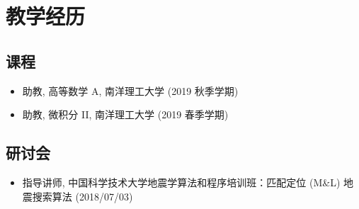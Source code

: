 \section{教学经历}

\subsection{课程}
\begin{itemize}
\item 助教, 高等数学 A, 南洋理工大学 (2019 秋季学期)
\item 助教, 微积分 II, 南洋理工大学 (2019 春季学期)
\end{itemize}

\subsection{研讨会}
\begin{itemize}
	\item 指导讲师, 中国科学技术大学地震学算法和程序培训班：匹配定位 (M\&L) 地震搜索算法 (2018/07/03)
\end{itemize}
